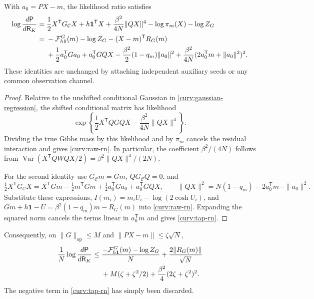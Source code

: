 \documentclass[11pt,reqno]{amsart}
\begin{document}
\begin{lem}\label{curv:rn-lemma}
With $a_0=PX-m$, the likelihood ratio satisfies
\begin{align}
 \log\frac{d\mathsf P}{d\mathsf R_K}
  ={}&\frac12X^{\mathsf T}G_{\mathcal C}X+h\mathbf1^{\mathsf T}X
        +\frac{\beta^2}{4N}\|QX\|^4
        -\log\pi_m(X)-\log Z_G \label{curv:raw-rn}\\
  ={}&-\mathcal F^G_{h\mathbf1}(m)-\log Z_G
        -(X-m)^{\mathsf T}R_G(m)\notag\\
     &+\frac12a_0^{\mathsf T}Ga_0+a_0^{\mathsf T}GQX
       -\frac{\beta^2}{2}(1-q_m)\|a_0\|^2
       +\frac{\beta^2}{4N}(2a_0^{\mathsf T}m+\|a_0\|^2)^2.
 \label{curv:tap-rn}
\end{align}
These identities are unchanged by attaching independent auxiliary seeds
or any common observation channel.
\end{lem}

\begin{proof}
Relative to the unshifted conditional Gaussian in
\eqref{curv:gaussian-regression}, the shifted conditional matrix has
likelihood
\[
 \exp\left\{\frac12X^{\mathsf T}QGQX
                   -\frac{\beta^2}{4N}\|QX\|^4\right\}.
\]
Dividing the true Gibbs mass by this likelihood and by $\pi_m$ cancels
the residual interaction and gives \eqref{curv:raw-rn}. In particular,
the coefficient $\beta^2/(4N)$ follows from
$\operatorname{Var}(X^{\mathsf T}QWQX/2)
     =\beta^2\|QX\|^4/(2N)$.

For the second identity use $G_{\mathcal C}m=Gm$,
$QG_{\mathcal C}Q=0$, and
\[
 \tfrac12X^{\mathsf T}G_{\mathcal C}X
 =X^{\mathsf T}Gm-\tfrac12m^{\mathsf T}Gm
              +\tfrac12a_0^{\mathsf T}Ga_0+a_0^{\mathsf T}GQX,
 \qquad
 \|QX\|^2=N(1-q_m)-2a_0^{\mathsf T}m-\|a_0\|^2.
\]
Substitute these expressions, $I(m_i)=m_iU_i-\log(2\cosh U_i)$, and
$Gm+h\mathbf1-U=\beta^2(1-q_m)m-R_G(m)$ into
\eqref{curv:raw-rn}. Expanding the squared norm cancels the terms linear
in $a_0^{\mathsf T}m$ and gives \eqref{curv:tap-rn}.
\end{proof}

Consequently, on $\|G\|_{\mathrm{op}}\le M$ and
$\|PX-m\|\le\zeta\sqrt N$,
\begin{align}
 \frac1N\log\frac{d\mathsf P}{d\mathsf R_K}
 \le{}&\frac{-\mathcal F^G_{h\mathbf1}(m)-\log Z_G}{N}
          +\frac{2\|R_G(m)\|}{\sqrt N}\notag\\
       &+M(\zeta+\zeta^2/2)
          +\frac{\beta^2}{4}(2\zeta+\zeta^2)^2.
 \label{curv:rn-bound}
\end{align}
The negative term in \eqref{curv:tap-rn} has simply been discarded.
\end{document}

